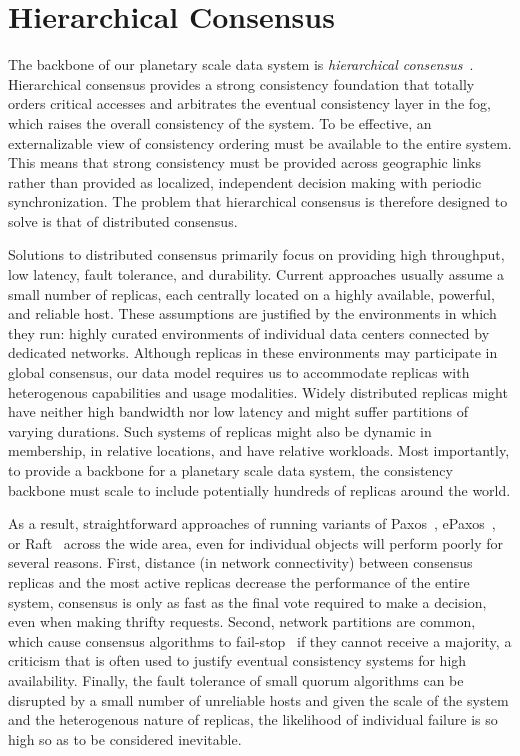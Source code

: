 
\renewcommand{\thechapter}{3}

\chapter{Hierarchical Consensus}

The backbone of our planetary scale data system is \emph{hierarchical consensus}~\cite{hc_brief_announcement}.
Hierarchical consensus provides a strong consistency foundation that totally orders critical accesses and arbitrates the eventual consistency layer in the fog, which raises the overall consistency of the system.
To be effective, an externalizable view of consistency ordering must be available to the entire system.
This means that strong consistency must be provided across geographic links rather than provided as localized, independent decision making with periodic synchronization.
The problem that hierarchical consensus is therefore designed to solve is that of distributed consensus.

Solutions to distributed consensus primarily focus on providing high throughput, low latency, fault tolerance, and durability.
Current approaches \cite{epaxos,mencius,calvindb,spaxos,sutra_fast_2011,peluso_making_2016} usually assume a small number of replicas, each centrally located on a highly available, powerful, and reliable host.
These assumptions are justified by the environments in which they run: highly curated environments of individual data centers connected by dedicated networks.
Although replicas in these environments may participate in global consensus, our data model requires us to accommodate replicas with heterogenous capabilities and usage modalities.
Widely distributed replicas might have neither high bandwidth nor low latency and might suffer partitions of varying durations.
Such systems of replicas might also be dynamic in membership, in relative locations, and have relative workloads.
Most importantly, to provide a backbone for a planetary scale data system, the consistency backbone must scale to include potentially hundreds of replicas around the world.

As a result, straightforward approaches of running variants of Paxos~\cite{paxos}, ePaxos~\cite{epaxos}, or Raft~\cite{raft} across the wide area, even for individual objects will perform poorly for several reasons.
First, distance (in network connectivity) between consensus replicas and the most active replicas decrease the performance of the entire system, consensus is only as fast as the final vote required to make a decision, even when making thrifty requests.
Second, network partitions are common, which cause consensus algorithms to fail-stop~\cite{fail-stop} if they cannot receive a majority, a criticism that is often used to justify eventual consistency systems for high availability.
Finally, the fault tolerance of small quorum algorithms can be disrupted by a small number of unreliable hosts and given the scale of the system and the heterogenous nature of replicas, the likelihood of individual failure is so high so as to be considered inevitable.

